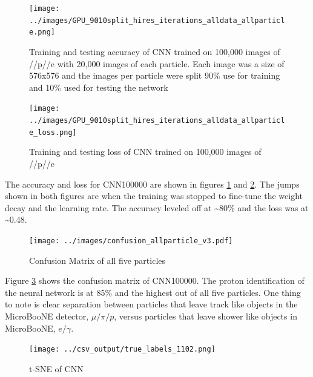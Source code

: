 \begin{figure}[htp!]
\centering
\texttt{[image: ../images/GPU\_9010split\_hires\_iterations\_alldata\_allparticle.png]}
\caption{Training and testing accuracy of CNN trained on 100,000 images of \mu/\pi/p/\gamma/e with 20,000 images of each particle. Each image was a size of 576x576 and the images per particle were split 90\% use for training and 10\% used for testing the network}
\label{fig:gpuacc}
\end{figure}

\begin{figure}[htp!]
\centering
\texttt{[image: ../images/GPU\_9010split\_hires\_iterations\_alldata\_allparticle\_loss.png]}
\caption{Training and testing loss of CNN trained on 100,000 images of \mu/\pi/p/\gamma/e}
\label{fig:gpuloss}
\end{figure}

The accuracy and loss for CNN100000 are shown in figures \ref{fig:gpuacc} and \ref{fig:gpuloss}. The jumps shown in both figures are when the training was stopped to fine-tune the weight decay and the learning rate. The accuracy leveled off at \sim 80\% and the loss was at \sim 0.48. 


\begin{figure}[htp!]
\centering
\texttt{[image: ../images/confusion\_allparticle\_v3.pdf]}
\caption{Confusion Matrix of all five particles }
\label{fig:confusion100000}
\end{figure}

Figure \ref{fig:confusion100000} shows the confusion matrix of CNN100000. The proton identification of the neural network is at 85\% and the highest out of all five particles. One thing to note is clear separation between particles that leave track like objects in the MicroBooNE detector, $\mu/\pi/p$, versus particles that leave shower like objects in MicroBooNE, $e/\gamma$. 

\begin{figure}[htp!]
\centering
\texttt{[image: ../csv\_output/true\_labels\_1102.png]}
\caption{t-SNE of CNN}
\label{fig:tsne}
\end{figure}

